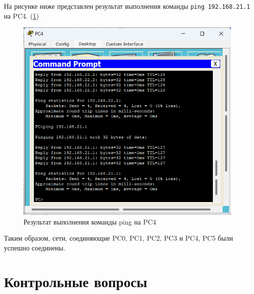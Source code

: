 \documentclass[14pt]{extarticle}
\makeatletter
\newcommand{\numbersections}{\renewcommand{\Hy@numberline}[1]{##1~}}
\let\oldsection\section
\renewcommand{\section}{\numbersections\oldsection}
\makeatother
\begin{document}
На рисунке ниже представлен результат выполнения команды \texttt{ping 192.168.21.1} на PC4. (\ref{img:PC4Ping0})

\begin{figure}[H]
    \centering
    \includegraphics[width=1.0\linewidth]{PC4Ping0.png}
    \caption{Результат выполнения команды ping на PC4\label{img:PC4Ping0}}
\end{figure}

Таким образом, сети, соединяющие PC0, PC1, PC2, PC3 и PC4, PC5 были успешно соединены.

\section{Контрольные вопросы}
\end{document}
